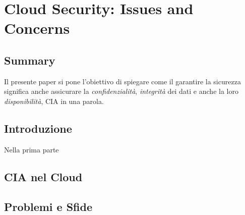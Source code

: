 \chapter{Cloud Security: Issues and Concerns}



\newpage


\section{Summary}
Il presente paper si pone l'obiettivo di spiegare come il garantire la sicurezza significa anche assicurare la \textit{confidenzialità}, \textit{integrità} dei dati e anche la loro \textit{disponibilità}, CIA in una parola.

\section{Introduzione}
Nella prima parte
\section{CIA nel Cloud}

\section{Problemi e Sfide}